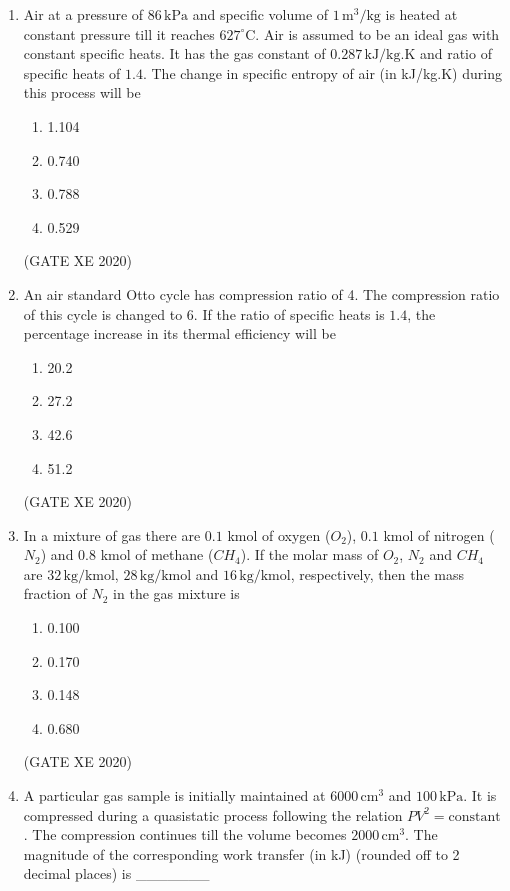 \documentclass[12pt]{article}
\begin{document}
\begin{enumerate}
\item Air at a pressure of $86 \,\text{kPa}$ and specific volume of $1 \,\text{m}^3/\text{kg}$ is heated at constant pressure till it reaches $627^\circ \text{C}$. Air is assumed to be an ideal gas with constant specific heats. It has the gas constant of $0.287 \,\text{kJ/kg.K}$ and ratio of specific heats of $1.4$. The change in specific entropy of air (in kJ/kg.K) during this process will be
\begin{enumerate}
\item 1.104
\item 0.740
\item 0.788
\item 0.529
\end{enumerate}
(GATE XE 2020)

\item An air standard Otto cycle has compression ratio of 4. The compression ratio of this cycle is changed to 6. If the ratio of specific heats is $1.4$, the percentage increase in its thermal efficiency will be
\begin{enumerate}
\item 20.2
\item 27.2
\item 42.6
\item 51.2
\end{enumerate}
(GATE XE 2020)

\item In a mixture of gas there are $0.1$ kmol of oxygen ($O_2$), $0.1$ kmol of nitrogen ($N_2$) and $0.8$ kmol of methane ($CH_4$). If the molar mass of $O_2$, $N_2$ and $CH_4$ are $32 \,\text{kg/kmol}$, $28 \,\text{kg/kmol}$ and $16 \,\text{kg/kmol}$, respectively, then the mass fraction of $N_2$ in the gas mixture is
\begin{enumerate}
\item 0.100
\item 0.170
\item 0.148
\item 0.680
\end{enumerate}
(GATE XE 2020)

\item A particular gas sample is initially maintained at $6000 \,\text{cm}^3$ and $100 \,\text{kPa}$. 
It is compressed during a quasistatic process following the relation $PV^2 = \text{constant}$. 
The compression continues till the volume becomes $2000 \,\text{cm}^3$. 
The magnitude of the corresponding work transfer (in kJ) (rounded off to 2 decimal places) is 
\_\_\_\_\_\_\_ 


\end{enumerate}
\end{document}
